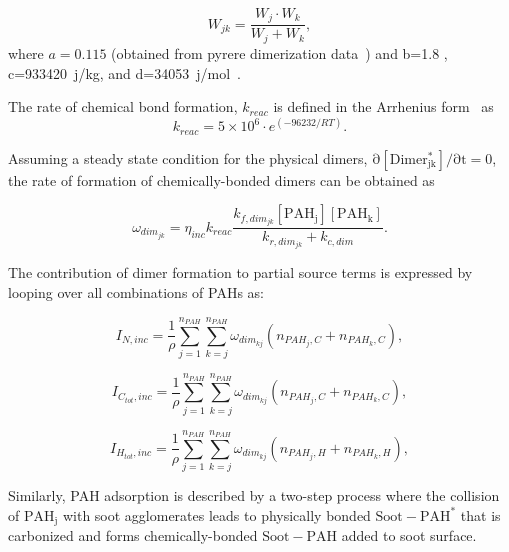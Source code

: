 \begin{equation}
	W_{jk} = \frac{W_j\cdot W_k}{W_j+W_k}
	\label{eqn:Wjk_reacdim},
\end{equation}
\noindent where ${a=0.115}$ (obtained from pyrere dimerization data~\cite{sabbah2010exploring}) and b=1.8 \cite{kholghy2018reactive}, c=933420~j/kg, and d=34053~j/mol~\cite{kholghy2018reactive}. 

The rate of chemical bond formation, ${k_{reac}}$ is defined in the Arrhenius form~\cite{naseri2022simulating} as
\begin{equation}
	k_{reac} = 5\times10^6\cdot e^{(-96232/RT)}
	\label{eqn:kc_reacdim}.
\end{equation}

Assuming a steady state condition for the physical dimers, $\mathrm{\partial [Dimer^*_{jk}]/\partial t=0}$, the rate of formation of chemically-bonded dimers can be obtained as

\begin{equation}
	\omega_{dim_{jk}} = \eta_{inc} k_{reac}\frac{k_{f,dim_{jk}}[\mathrm{PAH_j}][\mathrm{PAH_k}]}
	{k_{r,dim_{jk}}+k_{c,dim}}
	\label{eqn:chemdimer_reacdim}.
\end{equation}

The contribution of dimer formation to partial source terms is expressed by looping over all combinations of PAHs as:

\begin{equation}
	I_{N,{inc}} = 
	\frac{1}{\rho}
	\sum_{j=1}^{n_{PAH}} \sum_{k=j}^{n_{PAH}}  \omega_{dim_{kj}} 
	\left(
	n_{PAH_j,C}+n_{PAH_k,C}
	\right)
	\label{eqn:IN_inc},
\end{equation}

\begin{equation}
	I_{C_{tot},{inc}} = 
	\frac{1}{\rho}
	\sum_{j=1}^{n_{PAH}} \sum_{k=j}^{n_{PAH}}  \omega_{dim_{kj}} 
	\left(
	n_{PAH_j,C}+n_{PAH_k,C}
	\right)
	\label{eqn:ICtot_inc},
\end{equation}

\begin{equation}
	I_{H_{tot},{inc}} = 
	\frac{1}{\rho}
	\sum_{j=1}^{n_{PAH}} \sum_{k=j}^{n_{PAH}}  \omega_{dim_{kj}} 
	\left(
	n_{PAH_j,H}+n_{PAH_k,H}
	\right)
	\label{eqn:IHtot_inc},
\end{equation}

Similarly, PAH adsorption is described by a two-step process where the collision of $\mathrm{PAH_j}$ with soot agglomerates leads to physically bonded $\mathrm{Soot-PAH^*}$ that is carbonized and forms chemically-bonded $\mathrm{Soot-PAH}$ added to soot surface.

